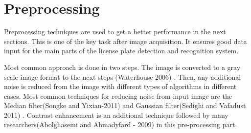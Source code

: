 \documentclass{standalone}
\begin{document}
\section{Preprocessing}

Preprocessing techniques are used to get a better performance in the next sections. This is one of the key task after image acquisition. It ensures good data input for the main parts of the license plate detection and recognition system.

Most common approach is done in two steps. The image is converted to a gray scale image format to the next steps (Waterhouse-2006) \cite{waterhouse-2006}. Then, any additional noise is reduced from the image with different types of algorithms in different cases. Most common techniques for reducing noise from input image are the Median filter(Songke and Yixian-2011) \cite{songke-yixian}
and Gaussian filter(Sedighi and Vafadust 2011) \cite{sedighi-vafadust}. Contrast enhancement is an additional technique followed by many researchers(Abolghasemi and Ahmadyfard - 2009) \cite{Abolghasemi2009} in this pre-processing part.
\end{document}
